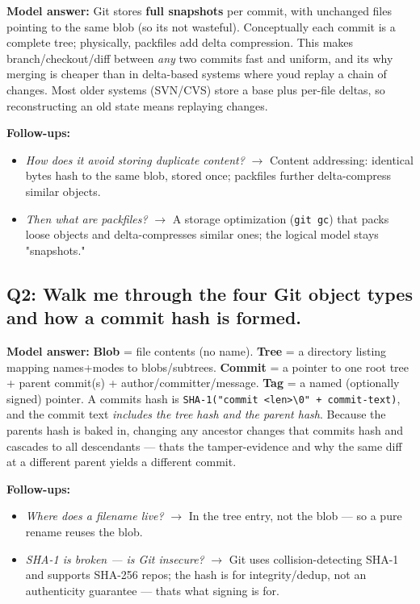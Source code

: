 \documentclass[11pt]{article}
\providecommand{\tightlist}{\setlength{\itemsep}{1pt}\setlength{\parskip}{0pt}}
\begin{document}
\textbf{Model answer:} Git stores \textbf{full snapshots} per commit, with unchanged files pointing to the same blob (so it\textquotesingle s not wasteful). Conceptually each commit is a complete tree; physically, packfiles add delta compression. This makes branch/checkout/diff between \emph{any} two commits fast and uniform, and it\textquotesingle s why merging is cheaper than in delta-based systems where you\textquotesingle d replay a chain of changes. Most older systems (SVN/CVS) store a base plus per-file deltas, so reconstructing an old state means replaying changes.

\textbf{Follow-ups:}

\begin{itemize}
\tightlist
\item
  \emph{How does it avoid storing duplicate content?} \(\rightarrow\) Content addressing: identical bytes hash to the same blob, stored once; packfiles further delta-compress similar objects.
\item
  \emph{Then what are packfiles?} \(\rightarrow\) A storage optimization (\texttt{git\ gc}) that packs loose objects and delta-compresses similar ones; the logical model stays "snapshots."
\end{itemize}

\subsection{Q2: Walk me through the four Git object types and how a commit hash is formed.}\label{q2-walk-me-through-the-four-git-object-types-and-how-a-commit-hash-is-formed}

\textbf{Model answer:} \textbf{Blob} = file contents (no name). \textbf{Tree} = a directory listing mapping names+modes to blobs/subtrees. \textbf{Commit} = a pointer to one root tree + parent commit(s) + author/committer/message. \textbf{Tag} = a named (optionally signed) pointer. A commit\textquotesingle s hash is \texttt{SHA-1("commit\ \textless{}len\textgreater{}\textbackslash{}0"\ +\ commit-text)}, and the commit text \emph{includes the tree hash and the parent hash}. Because the parent\textquotesingle s hash is baked in, changing any ancestor changes that commit\textquotesingle s hash and cascades to all descendants --- that\textquotesingle s the tamper-evidence and why the same diff at a different parent yields a different commit.

\textbf{Follow-ups:}

\begin{itemize}
\tightlist
\item
  \emph{Where does a filename live?} \(\rightarrow\) In the tree entry, not the blob --- so a pure rename reuses the blob.
\item
  \emph{SHA-1 is broken --- is Git insecure?} \(\rightarrow\) Git uses collision-detecting SHA-1 and supports SHA-256 repos; the hash is for integrity/dedup, not an authenticity guarantee --- that\textquotesingle s what signing is for.
\end{itemize}
\end{document}
